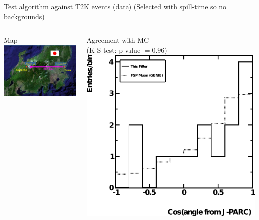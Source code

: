 \documentclass[14pt]{beamer}
\begin{document}
\begin{frame}{Test algorithm against T2K events (data)}
	{\small(Selected with spill-time so no backgrounds)}
	\begin{columns}[t]
		\begin{block}{\centering\small{Map}}
			\vspace{10mm}
			\includegraphics[width=\linewidth]{t2k.jpeg}
		\end{block}
		\begin{block}{\centering\small{Agreement with MC}\\
				\footnotesize{(K-S test: p-value $= 0.96$)}}
			\vspace{5mm}
			\includegraphics[width=\linewidth]{analyzed_rtq_t2k_nu_t2kReconDir_hist.pdf}
		\end{block}
	\end{columns}
\end{frame}
\end{document}
